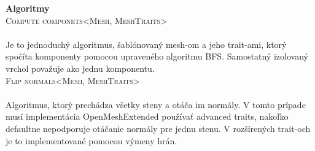 \documentclass{article}
\begin{document}
\textbf{Algoritmy}
\\

\textsc{Compute componets\textless Mesh, MeshTraits\textgreater}\\
\\
Je to jednoduchý algoritmus, šablónovaný mesh-om a jeho trait-ami, ktorý spočíta komponenty pomocou upraveného algoritmu BFS.
Samostatný izolovaný vrchol považuje ako jednu komponentu.
\\

\textsc{Flip normals\textless Mesh, MeshTraits\textgreater}\\
\\
Algoritmus, ktorý prechádza všetky steny a otáča im normály. V tomto prípade musí implementácia OpenMeshExtended používať
advanced traits, nakoľko defaultne nepodporuje otáčanie normály pre jednu stenu. 
V rozšírených trait-och je to implementované pomocou výmeny hrán.
\end{document}
